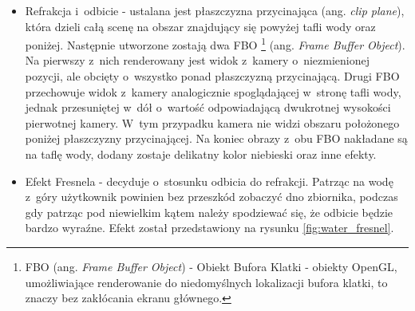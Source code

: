 \documentclass[a4paper,twoside,12pt]{book}
\newcommand{\obcy}[1]{\emph{#1}}
\newcommand{\ang}[1]{{\selectlanguage{british}\obcy{#1}}}
\begin{document}
\begin{itemize}
    \item Refrakcja i~odbicie - ustalana jest płaszczyzna przycinająca (ang. \ang{clip plane}), która dzieli całą scenę na obszar znajdujący się powyżej tafli wody oraz poniżej. Następnie utworzone zostają dwa FBO \footnote{FBO (ang. \ang{Frame Buffer Object}) - Obiekt Bufora Klatki - obiekty OpenGL, umożliwiające renderowanie do niedomyślnych lokalizacji bufora klatki, to znaczy bez zakłócania ekranu głównego.} (ang. \ang{Frame Buffer Object}). Na pierwszy z~nich renderowany jest widok z~kamery o~niezmienionej pozycji, ale obcięty o~wszystko ponad płaszczyzną przycinającą. Drugi FBO przechowuje widok z~kamery analogicznie spoglądającej w~stronę tafli wody, jednak przesuniętej w~dół o~wartość odpowiadającą dwukrotnej wysokości pierwotnej kamery. W~tym przypadku kamera nie widzi obszaru położonego poniżej płaszczyzny przycinającej. Na koniec obrazy z~obu FBO nakładane są na taflę wody, dodany zostaje delikatny kolor niebieski oraz inne efekty.
    \item Efekt Fresnela - decyduje o~stosunku odbicia do refrakcji. Patrząc na wodę z~góry użytkownik powinien bez przeszkód zobaczyć dno zbiornika, podczas gdy patrząc pod niewielkim kątem należy spodziewać się, że odbicie będzie bardzo wyraźne. Efekt został przedstawiony na rysunku \ref{fig:water_fresnel}.
    

\end{itemize}
\end{document}
